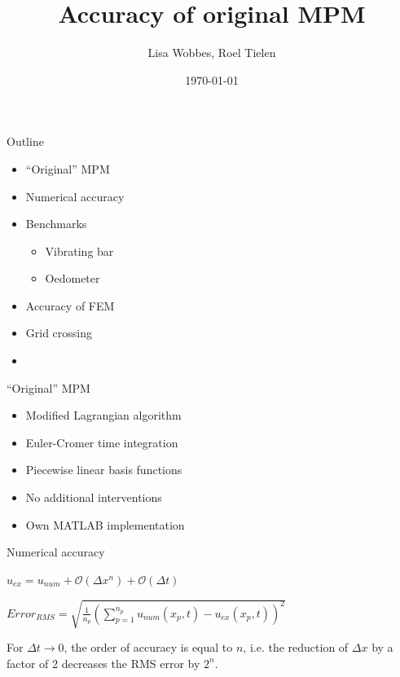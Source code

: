 \documentclass[mathserif,professionalfont]{beamer}
\title[Accuracy of original MPM]{Accuracy of original MPM}
\author[]{Lisa Wobbes, Roel Tielen}
\date[\today]{\today}
\begin{document}
{
\frame{\titlepage}
}

\begin{frame}{Outline}
\begin{itemize}
\item ``Original'' MPM
\item Numerical accuracy
\item Benchmarks
	\begin{itemize}
	\item Vibrating bar 
	\item Oedometer
	\end{itemize}
\item Accuracy of FEM
\item Grid crossing
\item
\end{itemize}
\end{frame}

\begin{frame}{``Original'' MPM}
\begin{itemize}
\item Modified Lagrangian algorithm
\item Euler-Cromer time integration
\item Piecewise linear basis functions
\item No additional interventions
\pause
\item Own MATLAB implementation
\end{itemize}
\end{frame}

\begin{frame}{Numerical accuracy}
\begin{tcolorbox}[colback=red!5,colframe=red!50!black,title=Numerical Approximation]
$u_{ex} = u_{num} + \mathcal{O}(\Delta x^n) + \mathcal{O}(\Delta t)$ %
\end{tcolorbox}
\begin{tcolorbox}[colback=red!5,colframe=red!50!black,title=RMS Error]
$Error_{RMS} = \sqrt{\frac{1}{n_p} \left(\sum_{p=1}^{n_p}u_{num}(x_p,t) - u_{ex}(x_p,t)\right)^2}$
\end{tcolorbox}
\begin{tcolorbox}[colback=blue!5,colframe=blue!40!black,title=Accuracy in displacement]
For $\Delta t \to 0$, the order of accuracy is equal to $n$, i.e. the reduction of $\Delta x$ by a factor of 2 decreases the RMS error by $2^n$.
\end{tcolorbox}
\end{frame}
\end{document}

